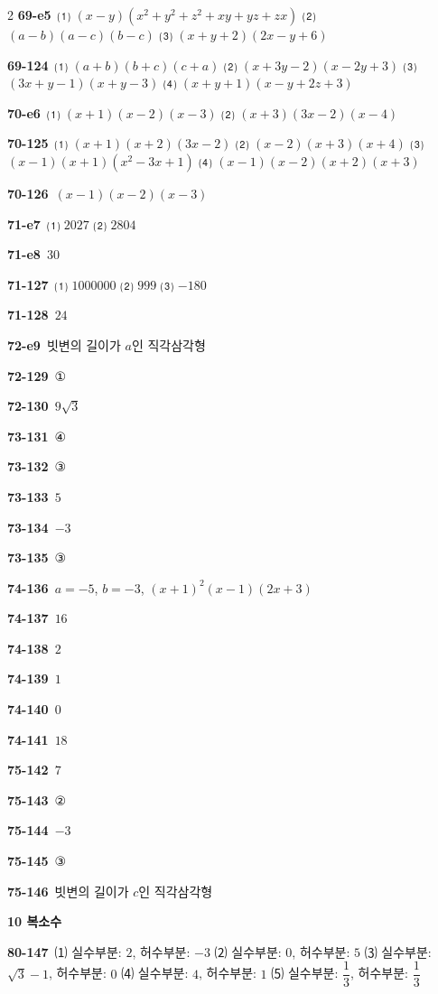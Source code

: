 \documentclass[10pt,a4paper]{article}
\begin{document}
\begin{multicols}{2}
\noindent\textbf{69-e5}\ ⑴ $(x-y)(x^2+y^2+z^2+xy+yz+zx)$ ⑵ $(a-b)(a-c)(b-c)$ ⑶ $(x+y+2)(2x-y+6)$\par
\noindent\textbf{69-124}\ ⑴ $(a+b)(b+c)(c+a)$ ⑵ $(x+3y-2)(x-2y+3)$ ⑶ $(3x+y-1)(x+y-3)$ ⑷ $(x+y+1)(x-y+2z+3)$\par
\noindent\textbf{70-e6}\ ⑴ $(x+1)(x-2)(x-3)$ ⑵ $(x+3)(3x-2)(x-4)$\par
\noindent\textbf{70-125}\ ⑴ $(x+1)(x+2)(3x-2)$ ⑵ $(x-2)(x+3)(x+4)$ ⑶ $(x-1)(x+1)(x^2-3x+1)$ ⑷ $(x-1)(x-2)(x+2)(x+3)$\par
\noindent\textbf{70-126}\ $(x-1)(x-2)(x-3)$\par
\noindent\textbf{71-e7}\ ⑴ $2027$ ⑵ $2804$\par
\noindent\textbf{71-e8}\ $30$\par
\noindent\textbf{71-127}\ ⑴ $1000000$ ⑵ $999$ ⑶ $-180$\par
\noindent\textbf{71-128}\ $24$\par
\noindent\textbf{72-e9}\ 빗변의 길이가 $a$인 직각삼각형\par
\noindent\textbf{72-129}\ ①\par
\noindent\textbf{72-130}\ $9\sqrt{3}$\par
\noindent\textbf{73-131}\ ④\par
\noindent\textbf{73-132}\ ③\par
\noindent\textbf{73-133}\ $5$\par
\noindent\textbf{73-134}\ $-3$\par
\noindent\textbf{73-135}\ ③\par
\noindent\textbf{74-136}\ $a=-5$, $b=-3$, $(x+1)^2(x-1)(2x+3)$\par
\noindent\textbf{74-137}\ $16$\par
\noindent\textbf{74-138}\ $2$\par
\noindent\textbf{74-139}\ $1$\par
\noindent\textbf{74-140}\ $0$\par
\noindent\textbf{74-141}\ $18$\par
\noindent\textbf{75-142}\ $7$\par
\noindent\textbf{75-143}\ ②\par
\noindent\textbf{75-144}\ $-3$\par
\noindent\textbf{75-145}\ ③\par
\noindent\textbf{75-146}\ 빗변의 길이가 $c$인 직각삼각형\par
\noindent\textbf{10 복소수}\par\smallskip
\noindent\textbf{80-147}\ ⑴ 실수부분: $2$, 허수부분: $-3$ ⑵ 실수부분: $0$, 허수부분: $5$ ⑶ 실수부분: $\sqrt{3}-1$, 허수부분: $0$ ⑷ 실수부분: $4$, 허수부분: $1$ ⑸ 실수부분: $\dfrac{1}{3}$, 허수부분: $\dfrac{1}{3}$\par

\end{multicols}
\end{document}
